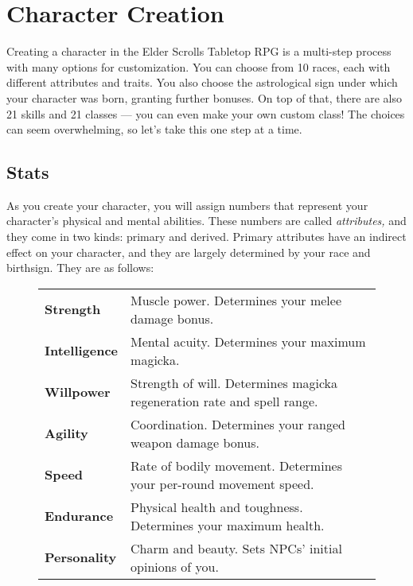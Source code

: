 \chapter{Character Creation}
Creating a character in the Elder Scrolls Tabletop RPG is a multi-step process with many options for customization. You can choose from 10 races, each with different attributes and traits. You also choose the astrological sign under which your character was born, granting further bonuses. On top of that, there are also 21 skills and 21 classes --- you can even make your own custom class! The choices can seem overwhelming, so let's take this one step at a time.

\section{Stats}

As you create your character, you will assign numbers that represent your character's physical and mental abilities. These numbers are called \textit{attributes,} and they come in two kinds: primary and derived. Primary attributes have an indirect effect on your character, and they are largely determined by your race and birthsign. They are as follows:

\begin{figure}[h]
\begin{tabular}[h]{p{}p{}}
	\rowcolor{gray!25}
	\textbf{Strength} & Muscle power. Determines your melee damage bonus.\\
	\textbf{Intelligence} & Mental acuity. Determines your maximum magicka.\\
	\textbf{Willpower} & Strength of will. Determines magicka regeneration rate and spell range.\\
	\textbf{Agility} & Coordination. Determines your ranged weapon damage bonus.\\
	\textbf{Speed} & Rate of bodily movement. Determines your per-round movement speed.\\
	\textbf{Endurance} & Physical health and toughness. Determines your maximum health.\\
	\textbf{Personality} & Charm and beauty. Sets NPCs' initial opinions of you.\\
\end{tabular}
\end{figure}

